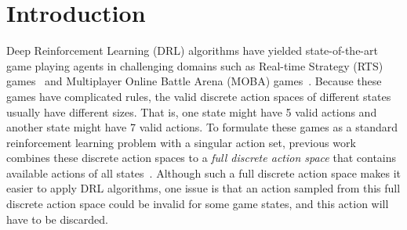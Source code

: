 \documentclass[letterpaper]{article}
\begin{document}
\section{Introduction}


Deep Reinforcement Learning (DRL) algorithms have yielded state-of-the-art game playing agents in challenging domains such as Real-time Strategy (RTS) games~\cite{vinyals2017starcraft,vinyals2019grandmaster} and Multiplayer Online Battle Arena (MOBA) games~\cite{Berner2019Dota2W,ye2019mastering}. Because these games have complicated rules, the valid discrete action spaces of different states usually have different sizes. That is, one state might have 5 valid actions and another state might have 7 valid actions. To formulate these games as a standard reinforcement learning problem with a singular action set, previous work combines these discrete action spaces to a \emph{full discrete action space} that contains available actions of all states~\cite{vinyals2017starcraft,Berner2019Dota2W,ye2019mastering}. Although such a full discrete action space makes it easier to apply DRL algorithms, one issue is that an action sampled from this full discrete action space could be invalid for some game states, and this action will have to be discarded.
\end{document}
